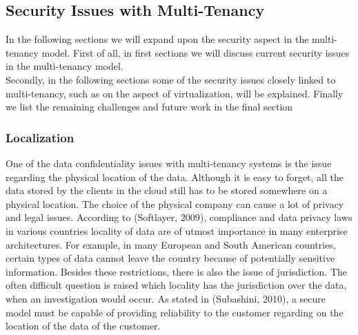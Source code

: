 \subsection{Security Issues with Multi-Tenancy}
In the following sections we will expand upon the security aspect in the multi-tenancy model. First of all, in first sections we will discuss current security issues in the multi-tenancy model. \\
Secondly, in the following sections some of the security issues closely linked to multi-tenancy, such as on the aspect of virtualization, will be explained. Finally we list the remaining challenges and future work in the final section\\

\subsubsection{Localization}
One of the data confidentiality issues with multi-tenancy systems is the issue regarding the physical location of the data. Although it is easy to forget, all the data stored by the clients in the cloud still has to be stored somewhere on a physical location. The choice of the physical company can cause a lot of privacy and legal issues. According to (Softlayer, 2009), compliance and data privacy laws in various countries locality of data are of utmost importance in many enterprise architectures. For example, in many European and South American countries, certain types of data cannot leave the country because of potentially sensitive information. Besides these restrictions, there is also the issue of jurisdiction. The often difficult question is raised which locality has the jurisdiction over the data, when an investigation would occur. As stated in (Subashini, 2010), a secure model must be capable of providing reliability to the customer regarding on the location of the data of the customer.\\
 
